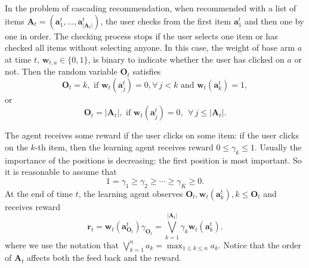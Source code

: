\documentclass{article}
\newcommand{\bA}{\mathbf{A}}
\newcommand{\ba}{\mathbf{a}}
\newcommand{\bO}{\mathbf{O}}
\newcommand{\br}{\mathbf{r}}
\newcommand{\bw}{\mathbf{w}}
\newcommand{\abs}[1]{\left| #1 \right|}
\begin{document}
In the problem of cascading recommendation, when recommended with a list of items $\bA_t = (\ba_{1}^t,...,\ba_{\abs{\bA_t}}^t)$, the user checks from the first item $\ba_{1}^t$ and then one by one in order. The checking process stops if the user selects one item or has checked all items without selecting anyone. In this case, the weight of base arm $a$ at time $t$, $\bw_{t,a} \in \{ 0, 1 \}$, is binary to indicate whether the user has clicked on $a$ or not. Then the random variable $\bO_t$ satisfies
$$
\bO_t = k, \text{ if } \bw_t(\ba_j^t)=0, \forall\, j < k \text{ and } \bw_t(\ba_k^t) = 1,
$$
or 
$$
\bO_t = \abs{\bA_t}, \text{ if }\bw_t(\ba_j^t) = 0, ~~ \forall\, j \leq \abs{\bA_t}.
$$

The agent receives some reward if the user clicks on some item: if the user clicks on the $k$-th item, then the learning agent receives reward $0 \leq \gamma_k \leq 1$. Usually the importance of the positions is decreasing: the first position is most important. So it is reasonable to assume that
$$
1 = \gamma_1 \geq \gamma_2 \geq \cdots \geq \gamma_K \geq 0.
$$
At the end of time $t$, the learning agent observes $\bO_t, \bw_t(\ba_k^t), k \leq \bO_t$ and receives reward
$$
\br_t = \bw_t(\ba_{\bO_t}^t) \gamma_{\bO_t} = \bigvee_{k=1}^{\abs{\bA_t}} \gamma_k \bw_t(\ba_k^t).
$$
where we use the notation that $\bigvee_{k=1}^n a_k = \max_{1 \leq k \leq n} a_k$. Notice that the order of $\bA_t$ affects both the feed back and the reward.
\end{document}

